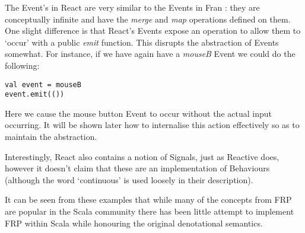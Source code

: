       The Event's in React are very similar to the Events in Fran \cite{Elliott1997}: they are conceptually infinite
      and have the \emph{merge} and \emph{map} operations defined on them. One slight difference is that React's
      Events expose an operation to allow them to `occur' with a public \emph{emit} function. This disrupts
      the abstraction of Events somewhat. For instance, if we have again have a \emph{mouseB} Event we could do the following:

\begin{verbatim}
val event = mouseB
event.emit(())
\end{verbatim}      

      Here we cause the mouse button Event to occur without the actual input occurring. It will be shown later how to     
      internalise this action effectively so as to maintain the abstraction. 

      Interestingly, React also contains a notion of Signals, just as Reactive does, 
      however it doesn't claim that these are an implementation of Behaviours (although the word `continuous' is
      used loosely in their description). 

  It can be seen from these examples that while many of the concepts from FRP are popular
  in the Scala community there has been little attempt to implement FRP within Scala while honouring
  the original denotational semantics.
